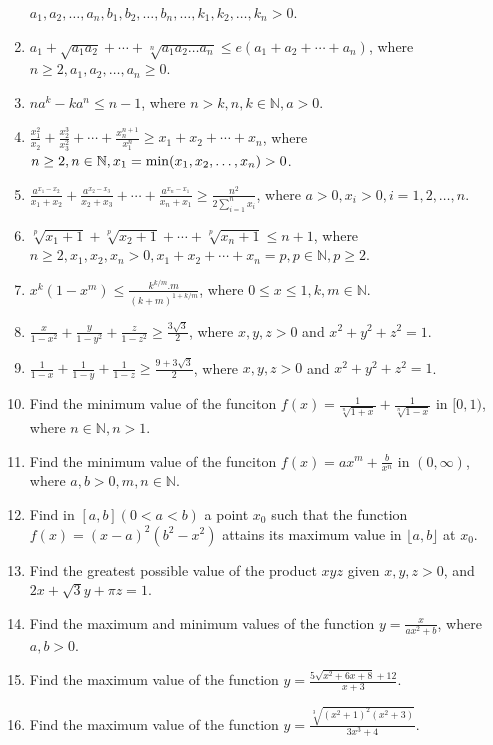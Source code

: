 \begin{enumerate}
  $a_1, a_2,\ldots, a_n, b_1, b_2, \ldots, b_n, \ldots, k_1, k_2, \ldots, k_n > 0$.
\item $a_1 + \sqrt{a_1a_2} + \cdots + \sqrt[n]{a_1a_2\ldots a_n}\leq e(a_1 + a_2 + \cdots + a_n)$, where $n\geq 2, a_1, a_2,
  \ldots, a_n\geq 0$.
\item $na^k - ka^n\leq n - 1$, where $n > k, n, k\in\mathbb{N}, a > 0$.
\item $\frac{x_1^2}{x_2} + \frac{x_2^3}{x_3^2} + \cdots + \frac{x_n^{n + 1}}{x_1^n}\geq x_1 + x_2 + \cdots + x_n$, where $n\geq 2,
  n\in\mathbb{N}, x_1 = {\rm min}(x_1, x_2, \ldots, x_n) > 0$.
\item $\frac{a^{x_1 - x_2}}{x_1 + x_2} + \frac{a^{x_2 - x_3}}{x_2 + x_3} + \cdots + \frac{a^{x_n - x_1}}{x_n +
  x_1}\geq \frac{n^2}{2\displaystyle\sum_{i=1}^nx_i}$, where $a > 0, x_i > 0, i = 1, 2, \ldots, n$.
\item $\sqrt[p]{x_1 + 1} + \sqrt[p]{x_2 + 1} + \cdots + \sqrt[p]{x_n + 1}\leq n + 1$, where $n\geq 2, x_1, x_2, x_n > 0, x_1 + x_2
  + \cdots + x_n = p, p\in\mathbb{N}, p\geq 2$.
\item $x^k(1 - x^m)\leq \frac{k^{k/m}.m}{(k + m)^{1 + k/m}}$, where $0\leq x\leq 1, k, m\in\mathbb{N}$.
\item $\frac{x}{1 - x^2} + \frac{y}{1 - y^2} + \frac{z}{1 - z^2}\geq \frac{3\sqrt{3}}{2}$, where $x, y, z > 0$ and $x^2 + y^2 + z^2
  = 1$.
\item $\frac{1}{1 - x} + \frac{1}{1 - y} + \frac{1}{1 - z}\geq \frac{9 + 3\sqrt{3}}{2}$, where $x, y, z > 0$ and $x^2 + y^2 + z^2
  = 1$.
\item Find the minimum value of the funciton $f(x) = \frac{1}{\sqrt[n]{1 + x}} + \frac{1}{\sqrt[n]{1 - x}}$ in $[0, 1)$, where
  $n\in\mathbb{N}, n > 1$.
\item Find the minimum value of the funciton $f(x) = ax^m + \frac{b}{x^n}$ in $(0, \infty)$, where $a, b > 0, m, n\in\mathbb{N}$.
\item Find in $[a, b] (0 < a < b)$ a point $x_0$ such that the function $f(x) = (x - a)^2(b^2 - x^2)$ attains its maximum value in
  $\lfloor a, b\rfloor$ at $x_0$.
\item Find the greatest possible value of the product $xyz$ given $x, y, z > 0$, and $2x + \sqrt{3}y + \pi z = 1$.
\item Find the maximum and minimum values of the function $y = \frac{x}{ax^2 + b}$, where $a, b > 0$.
\item Find the maximum value of the function $y = \frac{5\sqrt{x^2 + 6x + 8} + 12}{x + 3}$.
\item Find the maximum value of the function $y = \frac{\sqrt[3]{(x^2 + 1)^2(x^2 + 3)}}{3x^3 + 4}$.

\end{enumerate}
